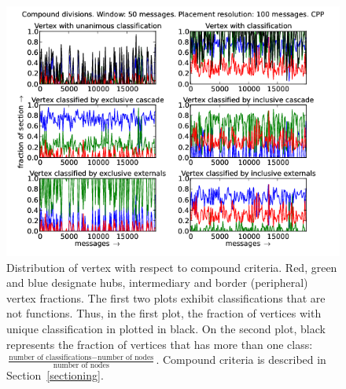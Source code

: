 \documentclass[%
 aip,
 jmp,%
 amsmath,amssymb,
 reprint,%
]{revtex4-1}
\begin{document}
\begin{figure}[hbtp] 
   \centering
        \includegraphics[width=\textwidth]{figs/CPP/50_2}
    \caption{Distribution of vertex with respect to compound criteria. Red, green and blue designate hubs, intermediary and border (peripheral) vertex fractions. The first two plots exhibit classifications that are not functions. Thus, in the first plot, the fraction of vertices with unique classification in plotted in black. On the second plot, black represents the fraction of vertices that has more than one class: $\frac{\text{number of classifications} - \text{number of nodes}}{\text{number of nodes}}$. Compound criteria is described in Section~\ref{sectioning}.}
    \label{fig:cpp50_}
\end{figure}
\end{document}
